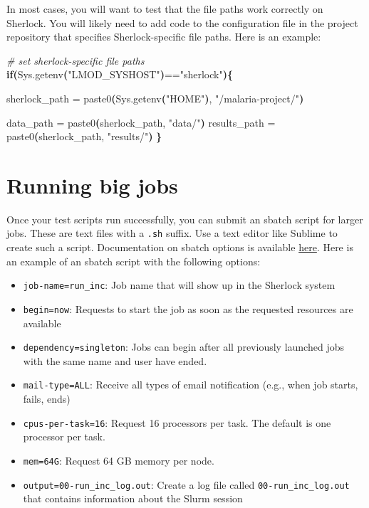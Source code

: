 \documentclass[
]{book}
\newenvironment{Shaded}{\begin{snugshade}}{\end{snugshade}}
\newcommand{\CommentTok}[1]{\textcolor[rgb]{0.56,0.35,0.01}{\textit{#1}}}
\newcommand{\ControlFlowTok}[1]{\textcolor[rgb]{0.13,0.29,0.53}{\textbf{#1}}}
\newcommand{\ErrorTok}[1]{\textcolor[rgb]{0.64,0.00,0.00}{\textbf{#1}}}
\newcommand{\ExtensionTok}[1]{#1}
\newcommand{\KeywordTok}[1]{\textcolor[rgb]{0.13,0.29,0.53}{\textbf{#1}}}
\newcommand{\NormalTok}[1]{#1}
\newcommand{\StringTok}[1]{\textcolor[rgb]{0.31,0.60,0.02}{#1}}
\providecommand{\tightlist}{%
  \setlength{\itemsep}{0pt}\setlength{\parskip}{0pt}}
\begin{document}
In most cases, you will want to test that the file paths work correctly on Sherlock. You will likely need to add code to the configuration file in the project repository that specifies Sherlock-specific file paths. Here is an example:

\begin{Shaded}
\begin{Highlighting}[]
\CommentTok{\# set sherlock{-}specific file paths}
\ControlFlowTok{if}\KeywordTok{(}\ExtensionTok{Sys.getenv}\ErrorTok{(}\StringTok{"LMOD\_SYSHOST"}\KeywordTok{)}\ExtensionTok{==}\StringTok{"sherlock"}\KeywordTok{)\{}
  
  \ExtensionTok{sherlock\_path}\NormalTok{ = paste0}\ErrorTok{(}\ExtensionTok{Sys.getenv}\ErrorTok{(}\StringTok{"HOME"}\KeywordTok{)}\ExtensionTok{,} \StringTok{"/malaria{-}project/"}\KeywordTok{)}
  
  \ExtensionTok{data\_path}\NormalTok{ = paste0}\ErrorTok{(}\ExtensionTok{sherlock\_path,} \StringTok{"data/"}\KeywordTok{)}
  \ExtensionTok{results\_path}\NormalTok{ = paste0}\ErrorTok{(}\ExtensionTok{sherlock\_path,} \StringTok{"results/"}\KeywordTok{)}
\KeywordTok{\}}
\end{Highlighting}
\end{Shaded}

\hypertarget{running-big-jobs-1}{%
\section{Running big jobs}\label{running-big-jobs-1}}

Once your test scripts run successfully, you can submit an sbatch script for larger jobs. These are text files with a \texttt{.sh} suffix. Use a text editor like Sublime to create such a script. Documentation on sbatch options is available \href{https://slurm.schedmd.com/sbatch.html}{here}. Here is an example of an sbatch script with the following options:

\begin{itemize}
\tightlist
\item
  \texttt{job-name=run\_inc}: Job name that will show up in the Sherlock system
\item
  \texttt{begin=now}: Requests to start the job as soon as the requested resources are available
\item
  \texttt{dependency=singleton}: Jobs can begin after all previously launched jobs with the same name and user have ended.
\item
  \texttt{mail-type=ALL}: Receive all types of email notification (e.g., when job starts, fails, ends)
\item
  \texttt{cpus-per-task=16}: Request 16 processors per task. The default is one processor per task.
\item
  \texttt{mem=64G}: Request 64 GB memory per node.
\item
  \texttt{output=00-run\_inc\_log.out}: Create a log file called \texttt{00-run\_inc\_log.out} that contains information about the Slurm session
\end{itemize}
\end{document}
